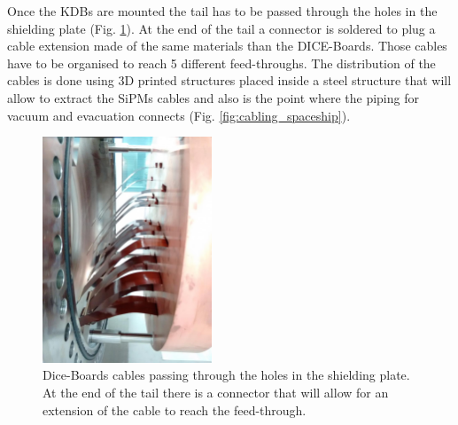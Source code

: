 Once the KDBs are mounted the tail has to be passed through the holes in the shielding plate (Fig. \ref{fig:cabling}). At the end of the tail a connector is soldered to plug a cable extension made of the same materials than the DICE-Boards. Those cables have to be organised to reach 5 different feed-throughs. The distribution of the cables is done using 3D printed structures placed inside a steel structure that will allow to extract the SiPMs cables and also is the point where the piping for vacuum and evacuation connects (Fig. \ref{fig:cabling_spaceship}).


\begin{figure}[h!]
\begin{center}
\includegraphics[width=0.45\textwidth]{IMG/cabling}
\caption{Dice-Boards cables passing through the holes in the shielding plate. At the end of the tail there is a connector that will allow for an extension of the cable to reach the feed-through.}
\label{fig:cabling}
\end{center}
\end{figure}

